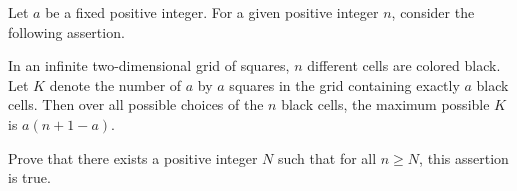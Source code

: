 Let $a$ be a fixed positive integer. For a given positive integer $n$, consider the following assertion.

In an infinite two-dimensional grid of squares, $n$ different cells are colored black. Let $K$ denote the number of $a$ by $a$ squares in the grid containing exactly $a$ black cells. Then over all possible choices of the $n$ black cells, the maximum possible $K$ is $a(n+1-a)$.

Prove that there exists a positive integer $N$ such that for all $n\ge N$, this assertion is true.
